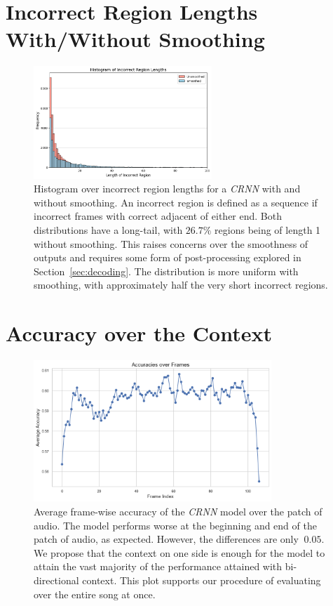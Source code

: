 \section{Incorrect Region Lengths With/Without Smoothing}\label{app:histogram_over_region_lengths}

\begin{figure}[H]
    \centering
    \includegraphics[width=0.6\textwidth]{figures/incorrect_region_smoothing_histogram.png}
    \caption{Histogram over incorrect region lengths for a \emph{CRNN} with and without smoothing. An incorrect region is defined as a sequence if incorrect frames with correct adjacent of either end. Both distributions have a long-tail, with $26.7\%$ regions being of length 1 without smoothing. This raises concerns over the smoothness of outputs and requires some form of post-processing explored in Section~\ref{sec:decoding}. The distribution is more uniform with smoothing, with approximately half the very short incorrect regions.}
    \label{fig:histogram_over_region_lengths}
\end{figure}

\section{Accuracy over the Context}\label{app:accuracy_over_context}
\begin{figure}[H]
    \centering
    \includegraphics[width=0.8\textwidth]{figures/accuracy_over_frames.png}
    \caption{Average frame-wise accuracy of the \emph{CRNN} model over the patch of audio. The model performs worse at the beginning and end of the patch of audio, as expected. However, the differences are only $~0.05$. We propose that the context on one side is enough for the model to attain the vast majority of the performance attained with bi-directional context. This plot supports our procedure of evaluating over the entire song at once. }\label{fig:crnn_context}
\end{figure}

